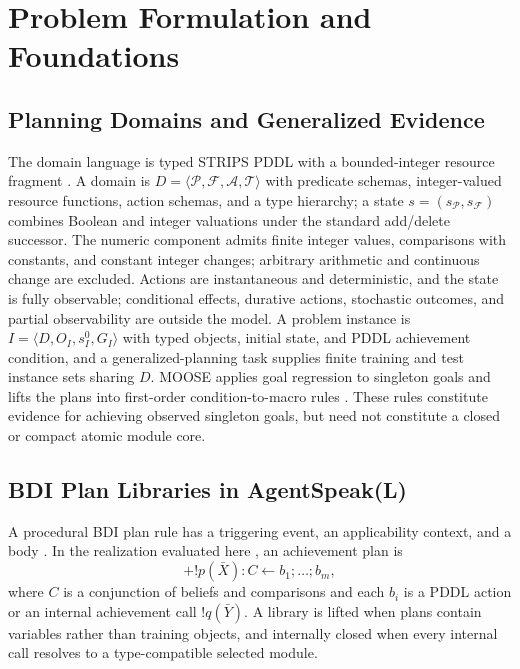 \section{Problem Formulation and Foundations}
\label{sec:background}

\subsection{Planning Domains and Generalized Evidence}

The domain language is typed STRIPS PDDL with a bounded-integer resource fragment
\cite{FikesNilsson1971STRIPS,McDermott1998PDDL,FoxLong2003PDDL21}. A domain is
$D=\langle\mathcal{P},\mathcal{F},\mathcal{A},\mathcal{T}\rangle$ with predicate
schemas, integer-valued resource functions, action schemas, and a type
hierarchy; a state $s=(s_{\mathcal P},s_{\mathcal F})$ combines Boolean and
integer valuations under the standard add/delete successor. The numeric
component admits finite integer values, comparisons with constants, and
constant integer changes; arbitrary arithmetic and continuous change are
excluded. Actions are instantaneous and deterministic, and the state is fully
observable; conditional effects, durative actions, stochastic outcomes, and
partial observability are outside the model. A problem instance is
$I=\langle D,O_I,s_I^0,G_I\rangle$ with typed
objects, initial state, and PDDL achievement condition, and a
generalized-planning task supplies finite training and test instance sets
sharing $D$. MOOSE applies goal regression
\cite{Fikes1972GeneralizedRobotPlans,Alcazar2013Regression} to singleton goals
and lifts the plans into first-order condition-to-macro rules
\cite{Chen2026Moose}. These rules constitute evidence for achieving observed
singleton goals, but need not constitute a closed or
compact atomic module core.

\subsection{BDI Plan Libraries in AgentSpeak(L)}

A procedural BDI plan rule has a triggering event, an applicability context,
and a body \cite{MeneguzziDeSilva2015PlanningBDI}. In the \asl{} realization
evaluated here \cite{Rao1996AgentSpeak}, an achievement plan is
\[
+!p(\bar X):C\leftarrow b_1;\ldots;b_m,
\]
where $C$ is a conjunction of beliefs and comparisons and each $b_i$ is a PDDL
action or an internal achievement call $!q(\bar Y)$. A library is lifted when
plans contain variables rather than training objects, and internally closed
when every internal call resolves to a type-compatible selected module.

